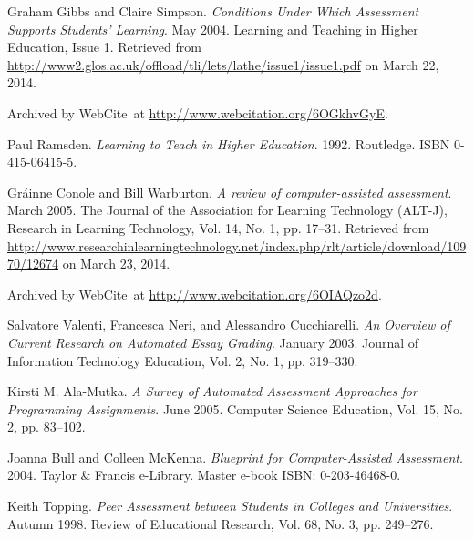 \begin{thebibliography}{9}
Graham Gibbs and Claire Simpson. \emph{Conditions Under Which Assessment
Supports Students' Learning}. May 2004. Learning and Teaching in Higher
Education, Issue 1. Retrieved from
\url{http://www2.glos.ac.uk/offload/tli/lets/lathe/issue1/issue1.pdf} on March
22, 2014.

Archived by WebCite\textsuperscript{\textregistered}\ at
\url{http://www.webcitation.org/6OGkhvGyE}.


Paul Ramsden. \emph{Learning to Teach in Higher Education}. 1992. Routledge.
ISBN 0-415-06415-5.


Gr\'ainne Conole and Bill Warburton. \emph{A review of computer-assisted
assessment}. March 2005. The Journal of the Association for Learning Technology
(ALT-J), Research in Learning Technology, Vol. 14, No. 1, pp. 17--31. Retrieved
from
\url{http://www.researchinlearningtechnology.net/index.php/rlt/article/download/10970/12674}
on March 23, 2014.

Archived by WebCite\textsuperscript{\textregistered}\ at
\url{http://www.webcitation.org/6OIAQzo2d}.


Salvatore Valenti, Francesca Neri, and Alessandro Cucchiarelli. \emph{An
Overview of Current Research on Automated Essay Grading}. January 2003. Journal
of Information Technology Education, Vol. 2, No. 1, pp. 319--330.


Kirsti M. Ala-Mutka. \emph{A Survey of Automated Assessment Approaches for
Programming Assignments}. June 2005. Computer Science Education, Vol. 15, No.
2, pp. 83--102.


Joanna Bull and Colleen McKenna. \emph{Blueprint for Computer-Assisted
Assessment}. 2004. Taylor \& Francis e-Library. Master e-book ISBN:
0-203-46468-0.


Keith Topping. \emph{Peer Assessment between Students in Colleges and
Universities}. Autumn 1998. Review of Educational Research, Vol. 68, No. 3, pp.
249--276.



\end{thebibliography}

